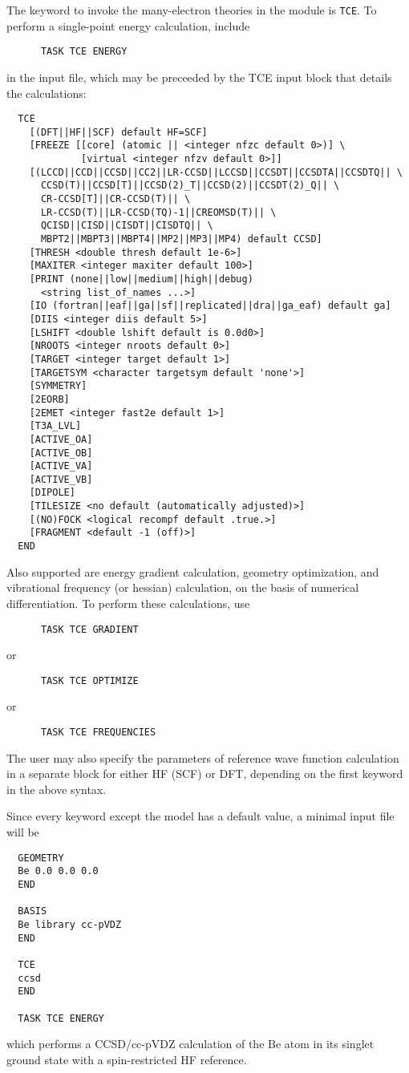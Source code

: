 The keyword to invoke the many-electron theories in the module is
\verb+TCE+.  To perform a single-point energy calculation, include
\begin{verbatim}
      TASK TCE ENERGY
\end{verbatim}
in the input file, which may be preceeded by the TCE input block
that details the calculations:
\begin{verbatim}
  TCE
    [(DFT||HF||SCF) default HF=SCF]
    [FREEZE [[core] (atomic || <integer nfzc default 0>)] \
             [virtual <integer nfzv default 0>]]
    [(LCCD||CCD||CCSD||CC2||LR-CCSD||LCCSD||CCSDT||CCSDTA||CCSDTQ|| \
      CCSD(T)||CCSD[T]||CCSD(2)_T||CCSD(2)||CCSDT(2)_Q|| \
      CR-CCSD[T]||CR-CCSD(T)|| \
      LR-CCSD(T)||LR-CCSD(TQ)-1||CREOMSD(T)|| \
      QCISD||CISD||CISDT||CISDTQ|| \
      MBPT2||MBPT3||MBPT4||MP2||MP3||MP4) default CCSD]
    [THRESH <double thresh default 1e-6>]
    [MAXITER <integer maxiter default 100>]
    [PRINT (none||low||medium||high||debug)
      <string list_of_names ...>]
    [IO (fortran||eaf||ga||sf||replicated||dra||ga_eaf) default ga]
    [DIIS <integer diis default 5>]
    [LSHIFT <double lshift default is 0.0d0>]
    [NROOTS <integer nroots default 0>]
    [TARGET <integer target default 1>]
    [TARGETSYM <character targetsym default 'none'>]
    [SYMMETRY]
    [2EORB]
    [2EMET <integer fast2e default 1>]
    [T3A_LVL] 
    [ACTIVE_OA]
    [ACTIVE_OB]
    [ACTIVE_VA]
    [ACTIVE_VB]
    [DIPOLE]
    [TILESIZE <no default (automatically adjusted)>]
    [(NO)FOCK <logical recompf default .true.>]
    [FRAGMENT <default -1 (off)>]
  END
\end{verbatim}
Also supported are energy gradient calculation, geometry optimization,
and vibrational frequency (or hessian) calculation, on the basis of
numerical differentiation.  To perform these calculations, use
\begin{verbatim}
      TASK TCE GRADIENT
\end{verbatim}
or
\begin{verbatim}
      TASK TCE OPTIMIZE
\end{verbatim}
or
\begin{verbatim}
      TASK TCE FREQUENCIES
\end{verbatim}

The user may also specify the parameters of reference wave function calculation
in a separate block for either HF (SCF) or DFT, depending on the first keyword
in the above syntax.

Since every keyword except the model has a default value, a minimal input file will be
\begin{verbatim}
  GEOMETRY
  Be 0.0 0.0 0.0
  END

  BASIS
  Be library cc-pVDZ
  END

  TCE
  ccsd
  END

  TASK TCE ENERGY
\end{verbatim}
which performs a CCSD/cc-pVDZ calculation of the Be atom in its
singlet ground state with a spin-restricted HF reference.


